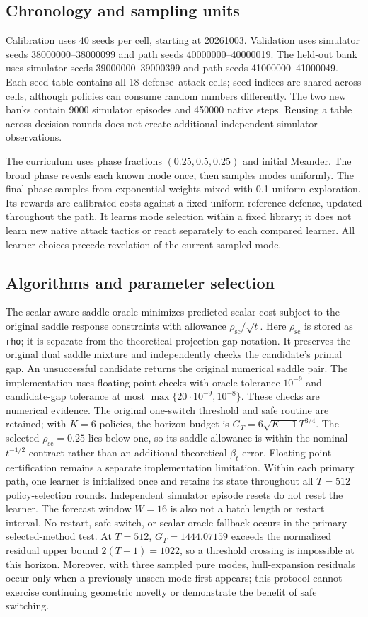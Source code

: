 \subsection{Chronology and sampling units}
Calibration uses 40 seeds per cell, starting at 20261003. Validation uses
simulator seeds 38000000--38000099 and path seeds 40000000--40000019. The
held-out bank uses simulator seeds 39000000--39000399 and path seeds
41000000--41000049. Each seed table contains all 18 defense--attack cells;
seed indices are shared across cells, although policies can consume random
numbers differently. The two new banks contain 9000 simulator episodes
and 450000 native steps. Reusing a table across decision rounds does not
create additional independent simulator observations.

The curriculum uses phase fractions $(0.25,0.5,0.25)$ and initial Meander.
The broad phase reveals each known mode once, then samples modes uniformly.
The final phase samples from exponential weights mixed with 0.1 uniform
exploration. Its rewards are calibrated costs against a fixed uniform
reference defense, updated throughout the path. It learns mode selection
within a fixed library; it does not learn new native attack tactics or
react separately to each compared learner. All learner choices precede
revelation of the current sampled mode.

\subsection{Algorithms and parameter selection}
The scalar-aware saddle oracle minimizes predicted scalar cost subject to
the original saddle response constraints with allowance $\rho_{\mathrm{sc}}/\sqrt{t}$.
Here $\rho_{\mathrm{sc}}$ is stored as \texttt{rho}; it is separate from the
theoretical projection-gap notation.
It preserves the original dual saddle mixture and independently checks the
candidate's primal gap. An unsuccessful candidate returns the original
numerical saddle pair. The implementation uses floating-point checks with
oracle tolerance $10^{-9}$ and candidate-gap tolerance at most
$\max\{20\cdot10^{-9},10^{-8}\}$. These checks are numerical evidence.
The original one-switch threshold and safe routine are retained; with
$K=6$ policies, the horizon budget is $G_T=6\sqrt{K-1}T^{3/4}$.
The selected $\rho_{\mathrm{sc}}=0.25$ lies below one, so its saddle allowance
is within the nominal $t^{-1/2}$ contract rather than an additional
theoretical $\beta_t$ error. Floating-point certification remains a separate
implementation limitation.
Within each primary path, one learner is initialized once and retains its
state throughout all $T=512$ policy-selection rounds. Independent simulator
episode resets do not reset the learner. The forecast window $W=16$ is also
not a batch length or restart interval. No restart, safe switch, or
scalar-oracle fallback occurs in the primary selected-method test.
At $T=512$, $G_T=1444.07159$ exceeds the normalized residual upper bound
$2(T-1)=1022$, so a threshold crossing is impossible at this horizon.
Moreover, with three sampled pure modes, hull-expansion residuals occur only
when a previously unseen mode first appears; this protocol cannot exercise
continuing geometric novelty or demonstrate the benefit of safe switching.

